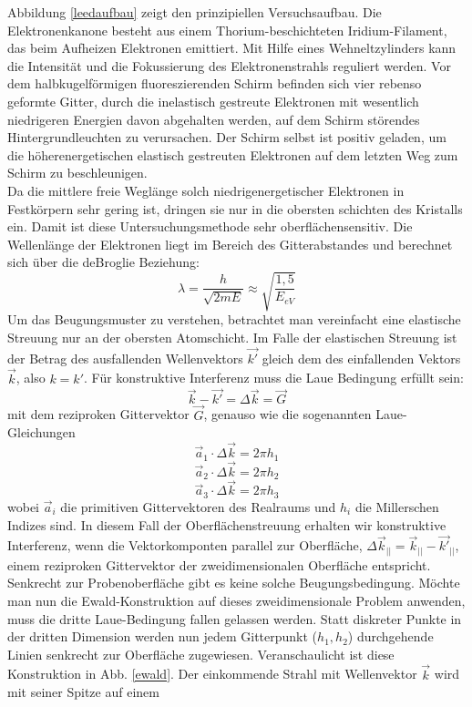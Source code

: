  Abbildung \ref{leedaufbau} zeigt den prinzipiellen Versuchsaufbau. Die Elektronenkanone
 besteht aus einem Thorium-beschichteten Iridium-Filament, das beim
 Aufheizen Elektronen emittiert. Mit Hilfe eines Wehneltzylinders kann die
 Intensität und die Fokussierung des Elektronenstrahls reguliert werden. Vor dem
 halbkugelförmigen fluoreszierenden Schirm befinden sich vier rebenso geformte
 Gitter, durch die inelastisch gestreute Elektronen mit wesentlich niedrigeren Energien
 davon abgehalten werden, auf dem Schirm störendes Hintergrundleuchten zu
 verursachen. Der Schirm selbst ist positiv geladen, um die höherenergetischen
 elastisch gestreuten Elektronen auf dem letzten Weg zum Schirm zu
 beschleunigen.\\
  Da die mittlere freie Weglänge solch niedrigenergetischer Elektronen in
 Festkörpern sehr gering ist, dringen sie nur in die obersten schichten des
 Kristalls ein. Damit ist diese Untersuchungsmethode sehr oberflächensensitiv.
 Die Wellenlänge der Elektronen liegt im Bereich des Gitterabstandes und
 berechnet sich über die deBroglie Beziehung:
 \[\lambda=\frac{h}{\sqrt{2mE}}\approx \sqrt{\frac{1{,}5}{E_{eV}}}\]
Um das Beugungsmuster zu verstehen, betrachtet man vereinfacht eine elastische
Streuung nur an der obersten Atomschicht. Im Falle der elastischen Streuung ist
der Betrag des ausfallenden Wellenvektors $\vec{k'}$ gleich dem des
einfallenden Vektors $\vec{k}$, also $k=k'$. Für konstruktive Interferenz
muss die Laue Bedingung erfüllt sein:
\[\vec{k}-\vec{k'}=\Delta \vec{k}=\vec{G}\]
mit dem reziproken Gittervektor $\vec{G}$, genauso wie die sogenannten Laue-Gleichungen
\[\vec{a}_1\cdot \Delta \vec{k}=2\pi h_1\]
\[\vec{a}_2\cdot \Delta \vec{k}=2\pi h_2\]
\[\vec{a}_3\cdot \Delta \vec{k}=2\pi h_3\]
wobei $\vec{a}_i$ die primitiven Gittervektoren des Realraums und $h_i$ die Millerschen Indizes
sind. In diesem Fall der Oberflächenstreuung erhalten wir konstruktive Interferenz,
wenn die Vektorkomponten parallel zur Oberfläche, $\Delta\vec{k}_{||}=\vec{k}_{||}-\vec{k'}_{||}$,
einem reziproken Gittervektor der zweidimensionalen Oberfläche entspricht. Senkrecht zur Probenoberfläche
gibt es keine solche Beugungsbedingung. Möchte man nun die Ewald-Konstruktion auf dieses
zweidimensionale Problem anwenden, muss die dritte Laue-Bedingung fallen gelassen werden. Statt
diskreter Punkte in der dritten Dimension werden nun jedem Gitterpunkt ($h_1, h_2$) durchgehende
Linien senkrecht zur Oberfläche zugewiesen. Veranschaulicht ist diese Konstruktion in Abb.
\ref{ewald}. Der einkommende Strahl mit Wellenvektor $\vec{k}$ wird mit seiner Spitze auf einem
